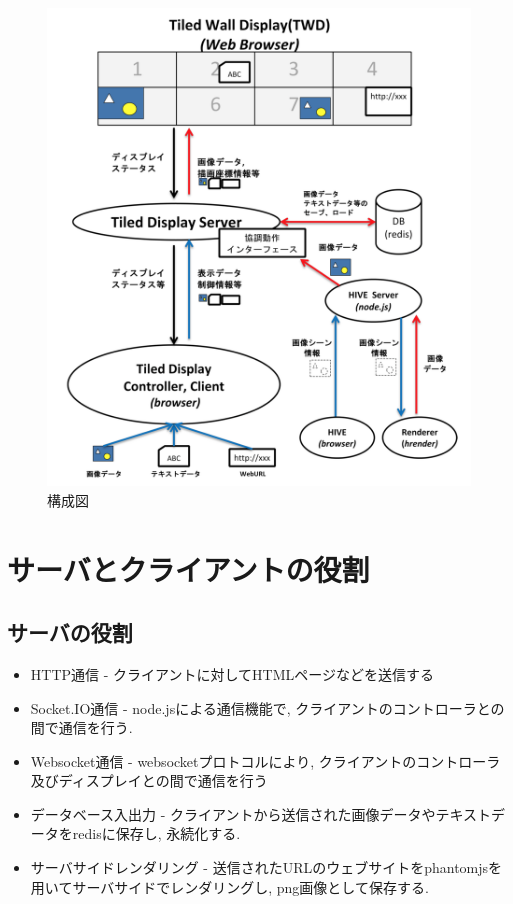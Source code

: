 \documentclass[a4paper,10pt,oneside]{jsbook}
\begin{document}
\begin{figure}[htbp]
	\begin{center}
		\includegraphics[width=11.5cm]{image/system.png}
	\end{center}
	\caption{構成図}
	\label{fig:system}
\end{figure}

\section{サーバとクライアントの役割}

\subsection{サーバの役割}
\begin{itemize}
\item HTTP通信 - クライアントに対してHTMLページなどを送信する
\item Socket.IO通信 - node.jsによる通信機能で, クライアントのコントローラとの間で通信を行う.
\item Websocket通信 - websocketプロトコルにより, クライアントのコントローラ及びディスプレイとの間で通信を行う
\item データベース入出力 - クライアントから送信された画像データやテキストデータをredisに保存し, 永続化する.
\item サーバサイドレンダリング - 送信されたURLのウェブサイトをphantomjsを用いてサーバサイドでレンダリングし, png画像として保存する.
\end{itemize}
\end{document}
